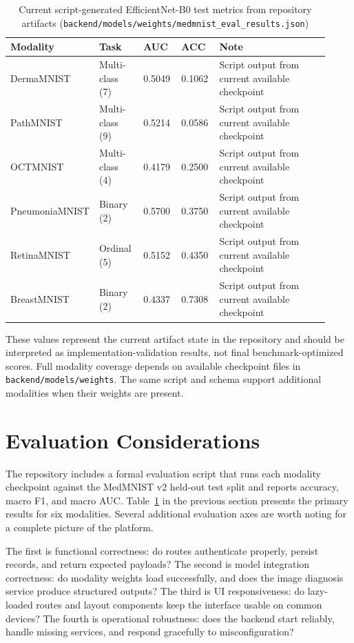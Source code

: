 \documentclass[conference]{IEEEtran}
\begin{document}
\begin{table}[t]
\centering
\caption{Current script-generated EfficientNet-B0 test metrics from repository artifacts (\texttt{backend/models/weights/medmnist\_eval\_results.json})}
\label{tab:results}
\begin{tabular}{p{0.16\linewidth} p{0.14\linewidth} p{0.12\linewidth} p{0.12\linewidth} p{0.38\linewidth}}
\toprule
\textbf{Modality} & \textbf{Task} & \textbf{AUC} & \textbf{ACC} & \textbf{Note} \\
\midrule
DermaMNIST & Multi-class (7) & 0.5049 & 0.1062 & Script output from current available checkpoint \\
PathMNIST  & Multi-class (9) & 0.5214 & 0.0586 & Script output from current available checkpoint \\
OCTMNIST   & Multi-class (4) & 0.4179 & 0.2500 & Script output from current available checkpoint \\
PneumoniaMNIST & Binary (2) & 0.5700 & 0.3750 & Script output from current available checkpoint \\
RetinaMNIST & Ordinal (5) & 0.5152 & 0.4350 & Script output from current available checkpoint \\
BreastMNIST & Binary (2) & 0.4337 & 0.7308 & Script output from current available checkpoint \\
\bottomrule
\end{tabular}
\end{table}

These values represent the current artifact state in the repository and should be interpreted as implementation-validation results, not final benchmark-optimized scores. Full modality coverage depends on available checkpoint files in \texttt{backend/models/weights}. The same script and schema support additional modalities when their weights are present.

\section{Evaluation Considerations}
The repository includes a formal evaluation script that runs each modality checkpoint against the MedMNIST v2 held-out test split and reports accuracy, macro F1, and macro AUC. Table~\ref{tab:results} in the previous section presents the primary results for six modalities. Several additional evaluation axes are worth noting for a complete picture of the platform.

The first is functional correctness: do routes authenticate properly, persist records, and return expected payloads? The second is model integration correctness: do modality weights load successfully, and does the image diagnosis service produce structured outputs? The third is UI responsiveness: do lazy-loaded routes and layout components keep the interface usable on common devices? The fourth is operational robustness: does the backend start reliably, handle missing services, and respond gracefully to misconfiguration?
\end{document}
